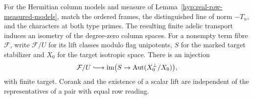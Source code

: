 \begin{proposition}\label{prop:measured-columns}
For the Hermitian column models and measure of Lemma~\ref{hyp:real-row-measured-models}, match the ordered
frames, the distinguished line of norm \(-T_u\), and the characters
at both type primes. The resulting finite adelic transport induces an
isometry of the degree-zero column spaces. For a nonempty term fibre \(\mathcal F\), write \(\mathcal F/U\) for its lift classes modulo flag unipotents, \(S\) for the marked target stabilizer and \(X_0\) for the target isotropic space. There is an injection
\[
 \mathcal F/U\lhook\joinrel\longrightarrow\operatorname{im}\bigl(S\to\operatorname{Aut}(X_0^\perp/X_0)\bigr),
\]
with finite target. Corank and the existence of a scalar lift are
independent of the representatives of a pair with equal row reading.
\end{proposition}

